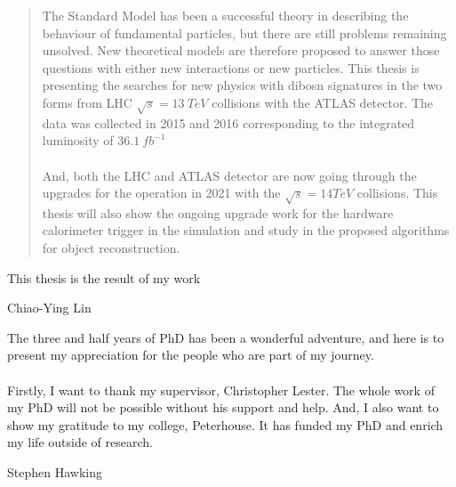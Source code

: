 
\begin{abstract}%
The Standard Model has been a successful theory in describing the behaviour of fundamental particles, but there are still problems remaining unsolved. New theoretical models are therefore proposed to answer those questions with either new interactions or new particles. This thesis is presenting the searches for new physics with dibosn signatures in the two forms from LHC $\sqrt{s}=13~TeV$ collisions with the ATLAS detector. The data was collected in 2015 and 2016 corresponding to the integrated luminosity of $36.1~fb^{-1}$
\\
\\And, both the LHC and ATLAS detector are now going through the upgrades for the operation in 2021 with the $\sqrt{s}=14TeV$ collisions. This thesis will also show the ongoing upgrade work for the hardware calorimeter trigger in the simulation and study in the proposed algorithms for object reconstruction.  
\end{abstract}


\begin{declaration}
 This thesis is the result of my work
  \vspace*{1cm}
  \begin{flushright}
    Chiao-Ying Lin
  \end{flushright}
\end{declaration}


\begin{acknowledgements}
The three and half years of PhD has been a wonderful adventure, and here is to present my appreciation for the people who are part of my journey.
\\
\\Firstly, I want to thank my supervisor, Christopher Lester. The whole work of my PhD will not be possible without his support and help. And, I also want to show my gratitude to my college, Peterhouse. It has funded my PhD and enrich my life outside of research.

\end{acknowledgements}



\tableofcontents


%
  {Stephen Hawking}
\thispagestyle{empty}
